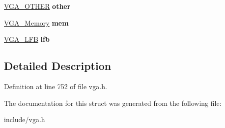 \begin{DoxyCompactItemize}
\item 
\hypertarget{structVGA__Type_ad29e73b7156cc43a315457215219e351}{\hyperlink{structVGA__OTHER}{V\-G\-A\-\_\-\-O\-T\-H\-E\-R} {\bfseries other}}\label{structVGA__Type_ad29e73b7156cc43a315457215219e351}

\item 
\hypertarget{structVGA__Type_ade860ae7b9935ad2fd4613758b998c1b}{\hyperlink{structVGA__Memory}{V\-G\-A\-\_\-\-Memory} {\bfseries mem}}\label{structVGA__Type_ade860ae7b9935ad2fd4613758b998c1b}

\item 
\hypertarget{structVGA__Type_ab46a6c5770cc6e5a528e6456e998af78}{\hyperlink{structVGA__LFB}{V\-G\-A\-\_\-\-L\-F\-B} {\bfseries lfb}}\label{structVGA__Type_ab46a6c5770cc6e5a528e6456e998af78}

\end{DoxyCompactItemize}


\subsection{Detailed Description}


Definition at line 752 of file vga.\-h.



The documentation for this struct was generated from the following file\-:\begin{DoxyCompactItemize}
\item 
include/vga.\-h\end{DoxyCompactItemize}
